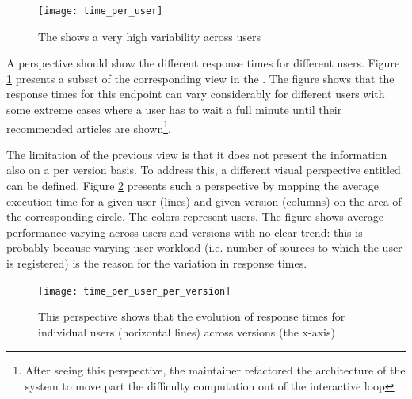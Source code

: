 \documentclass{sig-alternate-05-2015}
\begin{document}
\begin{figure}[!ht]
	\centering
	\texttt{[image: time\_per\_user]}
	\caption{The \epFeedItems shows a very high variability across users}
	\label{fig:tpu}
\end{figure}

A  perspective should show the different response times for different users. Figure \ref{fig:tpu} presents a subset of the corresponding view in the \tool. The figure shows that the response times for this endpoint can vary considerably for different users with some extreme cases where a user has to wait a full minute until their recommended articles are shown\footnote{After seeing this perspective, the maintainer refactored the architecture of the system to move part the difficulty computation out of the interactive loop}.



The limitation of the previous view is that it does not present the information also on a per version basis. To address this, a different visual perspective entitled  can be defined. Figure \ref{fig:tuv} presents such a perspective by mapping the average execution time for a given user (lines) and given version (columns) on the area of the corresponding circle. The colors represent users. The figure shows average performance varying  across users and versions with no clear trend: this is probably because varying user workload (i.e. number of sources to which the user is registered) is the reason for the variation in response times.

\begin{figure}[!ht]
	\centering
	\texttt{[image: time\_per\_user\_per\_version]}
	\caption{This perspective shows that the evolution of response times for individual users (horizontal lines) across versions (the x-axis)}
	\label{fig:tuv}
\end{figure}
\end{document}
